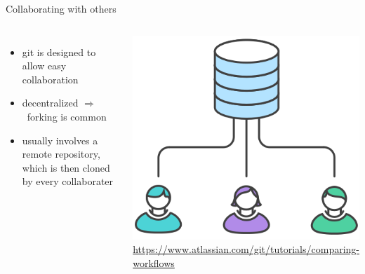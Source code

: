 \documentclass[10pt, graphics, aspectratio=169, table]{beamer}
\newcommand{\ra}{$\Rightarrow$\ }
\begin{document}
    \begin{frame}{Collaborating with others}
        \begin{columns}
                \begin{itemize}
                    \item git is designed to allow easy collaboration
                    \item decentralized \ra forking is common
                    \item usually involves a remote repository, which is then cloned by every collaborater
                \end{itemize}
                \center\includegraphics[scale=0.3]{img/collaboration.png}
                \center\tiny\url{https://www.atlassian.com/git/tutorials/comparing-workflows}
        \end{columns}
    \end{frame}
\end{document}
